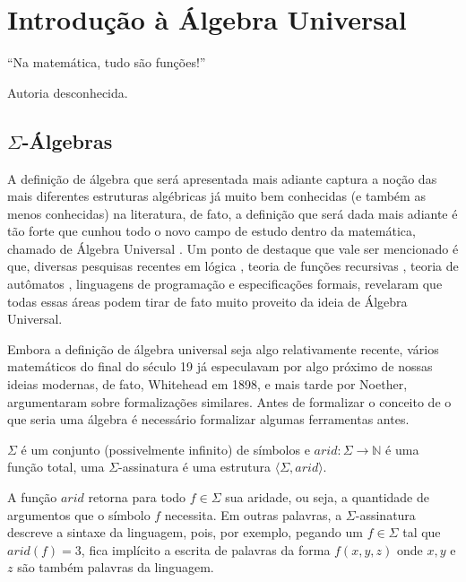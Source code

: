 \chapter{Introdução à Álgebra Universal}\label{cap:Semigroups}

\epigraph{``Na matemática, tudo são funções!''}{Autoria desconhecida.}

\section{$\Sigma$-Álgebras}\label{sec:basicSemigroups}

A definição de álgebra que será apresentada mais adiante captura a noção das mais diferentes estruturas algébricas já muito bem conhecidas (e também as menos conhecidas) na literatura, de fato, a definição que será dada mais adiante é tão forte que cunhou todo o novo campo de estudo dentro da matemática, chamado de Álgebra Universal \cite{denecke2018}. Um ponto de destaque que vale ser mencionado é que, diversas pesquisas recentes em lógica \cite{plotkin2012, riche2005}, teoria de funções recursivas \cite{rajesh2025}, teoria de autômatos \cite{gorrieri2023}, linguagens de programação e especificações formais, revelaram que todas essas áreas podem tirar de fato muito proveito da ideia de Álgebra Universal.

Embora a definição de álgebra universal seja algo relativamente recente, vários matemáticos do final do século 19 já especulavam por algo próximo de nossas ideias modernas, de fato, Whitehead em 1898, e mais tarde por Noether, argumentaram sobre formalizações similares. Antes de formalizar o conceito de o que seria uma álgebra é necessário formalizar algumas ferramentas antes.

\begin{definicao}\label{def:SigmaAssinatura}
  $\Sigma$ é um conjunto (possivelmente infinito) de símbolos e $arid: \Sigma \rightarrow \mathbb{N}$ é uma função total, uma $\Sigma$-assinatura é uma estrutura $\langle \Sigma, arid \rangle$.
\end{definicao}

A função $arid$ retorna para todo $f \in \Sigma$ sua aridade, ou seja, a quantidade de argumentos que o símbolo $f$ necessita. Em outras palavras, a $\Sigma$-assinatura descreve a sintaxe da linguagem, pois, por exemplo, pegando um $f \in \Sigma$ tal que $arid(f) = 3$, fica implícito a escrita de palavras da forma $f(x, y, z)$ onde $x, y$ e $z$ são também palavras da linguagem.

